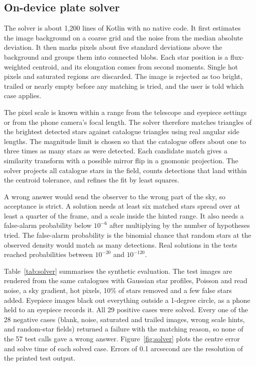 \subsection{On-device plate solver}
\label{sec:solver}

The solver is about 1,200 lines of Kotlin with no native code. It first estimates the image background on a coarse grid and the noise from the median absolute deviation. It then marks pixels about five standard deviations above the background and groups them into connected blobs. Each star position is a flux-weighted centroid, and its elongation comes from second moments. Single hot pixels and saturated regions are discarded. The image is rejected as too bright, trailed or nearly empty before any matching is tried, and the user is told which case applies.

The pixel scale is known within a range from the telescope and eyepiece settings or from the phone camera's focal length. The solver therefore matches triangles of the brightest detected stars against catalogue triangles using real angular side lengths. The magnitude limit is chosen so that the catalogue offers about one to three times as many stars as were detected. Each candidate match gives a similarity transform with a possible mirror flip in a gnomonic projection. The solver projects all catalogue stars in the field, counts detections that land within the centroid tolerance, and refines the fit by least squares.

A wrong answer would send the observer to the wrong part of the sky, so acceptance is strict. A solution needs at least six matched stars spread over at least a quarter of the frame, and a scale inside the hinted range. It also needs a false-alarm probability below $10^{-6}$ after multiplying by the number of hypotheses tried. The false-alarm probability is the binomial chance that random stars at the observed density would match as many detections. Real solutions in the tests reached probabilities between $10^{-20}$ and $10^{-120}$.

Table~\ref{tab:solver} summarises the synthetic evaluation. The test images are rendered from the same catalogues with Gaussian star profiles, Poisson and read noise, a sky gradient, hot pixels, 10\% of stars removed and a few false stars added. Eyepiece images black out everything outside a 1-degree circle, as a phone held to an eyepiece records it. All 29 positive cases were solved. Every one of the 28 negative cases (blank, noise, saturated and trailed images, wrong scale hints, and random-star fields) returned a failure with the matching reason, so none of the 57 test calls gave a wrong answer. Figure~\ref{fig:solver} plots the centre error and solve time of each solved case. Errors of 0.1 arcsecond are the resolution of the printed test output.

